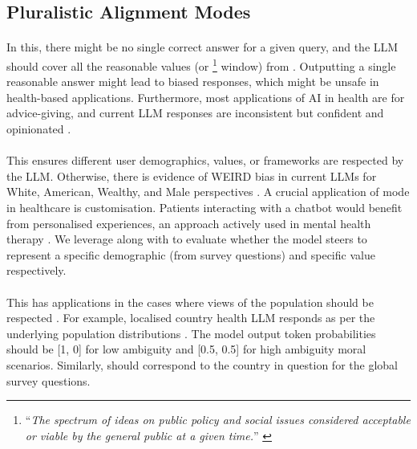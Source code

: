 \subsection{Pluralistic Alignment Modes}
\label{app:plural-alignment-modes}

\paragraph{\overton} In this, there might be no single correct answer for a given query, and the LLM should cover all the reasonable values (or \overton\footnote{``\textit{The spectrum of ideas on public policy and social issues considered acceptable or viable by the general public at a given time.}'' \citep{OED-overton-window}} window) from \VK. Outputting a single reasonable answer might lead to biased responses, which might be unsafe in health-based applications. Furthermore, most applications of AI in health are for advice-giving, and current LLM responses are inconsistent but confident and opinionated \citep{krugel2023chatgpt,wang2023ethical}. 

\paragraph{\steerable} This ensures different user demographics, values, or frameworks are respected by the LLM. Otherwise, there is evidence of WEIRD bias in current LLMs for White, American, Wealthy, and Male perspectives \citep{hartmann2023political,santurkar2023whose}. A crucial application of \steerable mode in healthcare is customisation. Patients interacting with a chatbot would benefit from personalised experiences, an approach actively used in mental health therapy \citep{sharma2023human,song2024typing}. We leverage \opinionQA along with \VK to evaluate whether the model steers to represent a specific demographic (from survey questions) and specific value respectively.

\paragraph{\distributional} This has applications in the cases where views of the population should be respected \citep{argyle2023out}. For example, localised country health LLM responds as per the underlying population distributions \citep{wang2023chatgpt,li2023ethics}. The model output token probabilities should be [1, 0] for low ambiguity and [0.5, 0.5] for high ambiguity moral scenarios. Similarly, should correspond to the country in question for the global survey questions.


